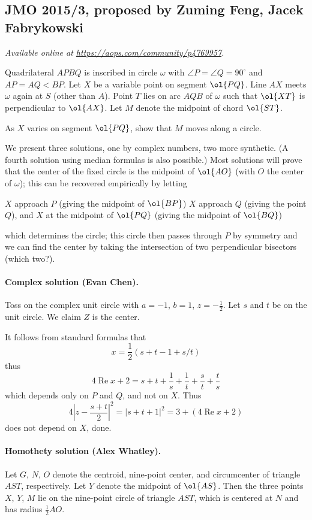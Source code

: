 \documentclass[11pt]{scrartcl}
\begin{document}
\subsection{JMO 2015/3, proposed by Zuming Feng, Jacek Fabrykowski}
\textsl{Available online at \url{https://aops.com/community/p4769957}.}
\begin{mdframed}[style=mdpurplebox,frametitle={Problem statement}]
Quadrilateral $APBQ$ is inscribed in circle $\omega$ with
$\angle P = \angle Q = 90^{\circ}$ and $AP = AQ < BP$.
Let $X$ be a variable point on segment $\ol{PQ}$.
Line $AX$ meets $\omega$ again at $S$ (other than $A$).
Point $T$ lies on arc $AQB$ of $\omega$ such that $\ol{XT}$
is perpendicular to $\ol{AX}$.
Let $M$ denote the midpoint of chord $\ol{ST}$.

As $X$ varies on segment $\ol{PQ}$, show that $M$ moves along a circle.
\end{mdframed}
We present three solutions,
one by complex numbers, two more synthetic.
(A fourth solution using median formulas is also possible.)
Most solutions will prove that the center of the fixed circle
is the midpoint of $\ol{AO}$
(with $O$ the center of $\omega$);
this can be recovered empirically by letting
\begin{itemize}
  \ii $X$ approach $P$ (giving the midpoint of $\ol{BP}$)
  \ii $X$ approach $Q$ (giving the point $Q$), and
  \ii $X$ at the midpoint of $\ol{PQ}$ (giving the midpoint of $\ol{BQ}$)
\end{itemize}
which determines the circle;
this circle then passes through $P$ by symmetry
and we can find the center by taking the intersection
of two perpendicular bisectors (which two?).

\paragraph{Complex solution (Evan Chen).}
Toss on the complex unit circle with $a = -1$, $b=1$, $z = -\tfrac12$.
Let $s$ and $t$ be on the unit circle. We claim $Z$ is the center.

It follows from standard formulas that
\[ x = \frac 12 \left( s + t - 1 + s/t \right) \]
thus \[ 4\operatorname{Re} x + 2
  = s + t + \frac 1s + \frac 1t + \frac st + \frac ts \]
which depends only on $P$ and $Q$, and not on $X$.
Thus \[ 4\left\lvert z-\frac{s+t}{2} \right\rvert^2
  = \left\lvert s+t+1 \right\rvert^2 = 3 + (4\operatorname{Re}x+2) \]
does not depend on $X$, done.

\paragraph{Homothety solution (Alex Whatley).}
Let $G$, $N$, $O$ denote the centroid, nine-point center,
and circumcenter of triangle $AST$, respectively.
Let $Y$ denote the midpoint of $\ol{AS}$.
Then the three points $X$, $Y$, $M$
lie on the nine-point circle of triangle $AST$,
which is centered at $N$ and has radius $\frac 12 AO$.
\end{document}
